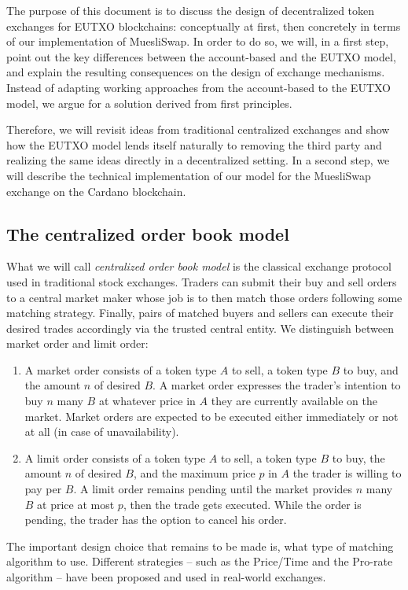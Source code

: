 \documentclass[11pt]{article}
\begin{document}
The purpose of this document is to discuss the design of decentralized token exchanges for EUTXO blockchains: conceptually at first, then concretely in terms of our implementation of MuesliSwap. In order to do so, we will, in a first step, point out the key differences between the account-based and the EUTXO model, and explain the resulting consequences on the design of exchange mechanisms. Instead of adapting working approaches from the account-based to the EUTXO model, we argue for a solution derived from first principles.

Therefore, we will revisit ideas from traditional centralized exchanges and show how the EUTXO model lends itself naturally to removing the third party and realizing the same ideas directly in a decentralized setting. In a second step, we will describe the technical implementation of our model for the MuesliSwap exchange on the Cardano blockchain.

\subsection{The centralized order book model}\label{centralized-order-book}

What we will call \emph{centralized order book model} is the classical exchange protocol used in traditional stock exchanges. Traders can submit their buy and sell orders to a central market maker whose job is to then match those orders following some matching strategy. Finally, pairs of matched buyers and sellers can execute their desired trades accordingly via the trusted central entity. We distinguish between market order and limit order:
\begin{enumerate}
    \item A market order consists of a token type $A$ to sell, a token type $B$ to buy, and the amount $n$ of desired $B$. A market order expresses the trader's intention to buy $n$ many $B$ at whatever price in $A$ they are currently available on the market. Market orders are expected to be executed either immediately or not at all (in case of unavailability).
    \item A limit order consists of a token type $A$ to sell, a token type $B$ to buy, the amount $n$ of desired $B$, and the maximum price $p$ in $A$ the trader is willing to pay per $B$. A limit order remains pending until the market provides $n$ many $B$ at price at most $p$, then the trade gets executed. While the order is pending, the trader has the option to cancel his order.
\end{enumerate}
The important design choice that remains to be made is, what type of matching algorithm to use. Different strategies -- such as the Price/Time and the Pro-rate algorithm -- have been proposed and used in real-world exchanges.
\end{document}
